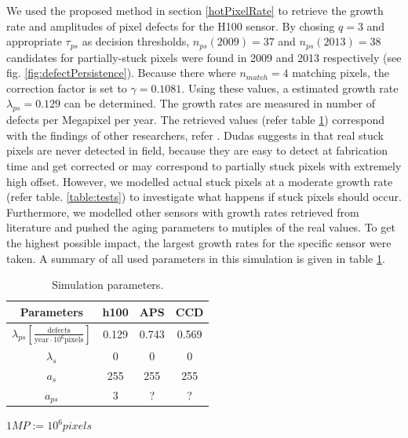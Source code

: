 \documentclass[10pt,twocolumn,letterpaper]{article}
\begin{document}
We used the proposed method in section \ref{hotPixelRate} to retrieve the growth rate and amplitudes of pixel defects for the H100 sensor. By chosing $q=3$ and appropriate $\tau_{ps}$ as decision thresholds, $n_{ps}(2009)=37$ and $n_{ps}(2013)=38$ candidates for partially-stuck pixels were found in 2009 and 2013 respectively (see fig. \ref{fig:defectPersistence}). Because there where $n_{match}=4$ matching pixels, the correction factor is set to $\gamma=0.1081$. Using these values, a estimated growth rate $\lambda_{ps}=0.129$ can be determined. The growth rates are measured in number of defects per Megapixel per year. The retrieved values (refer table \ref{table:parameters}) correspond with the findings of other researchers, refer \cite{defectDetection, leung}. Dudas suggests in \cite{inFieldDefects} that real stuck pixels are never detected in field, because they are easy to detect at fabrication time and get corrected or may correspond to partially stuck pixels with extremely high offset. However, we modelled actual stuck pixels at a moderate growth rate (refer table. \ref{table:tests}) to investigate what happens if stuck pixels should occur. Furthermore, we modelled other sensors with growth rates retrieved from literature and pushed the aging parameters to mutiples of the real values. To get the highest possible impact, the largest growth rates for the specific sensor were taken. A summary of all used parameters in this simulation is given in table \ref{table:parameters}.


 \bgroup
\def\arraystretch{1.3}%
 \begin{table} [h]
 \begin{center}
  \begin{tabular}{|c | c c c|}
  \hline 
   \textbf{Parameters} & h100  & APS \cite{leung} & CCD \cite{leung} \\
  \hline 
  $\lambda_{ps} [\frac{\text{defects}}{\text{year} \cdot 10^6 \text{pixels}}]$  & 0.129 &  0.743 & 0.569 \\
  $\lambda_s$ 	&  0  & 0 & 0 \\
  $a_s$		&  255  & 255 & 255 \\
  $a_{ps}$	&  3  & ? & ? \\
  \hline  
  \end{tabular}

  \vspace{1mm}
  \hfill \tiny { $1MP := 10^6 pixels$}
  \end{center}
    \vspace{-4mm}
  \label{table:parameters}
  \caption{Simulation parameters. }
\end{table}
\end{document}
